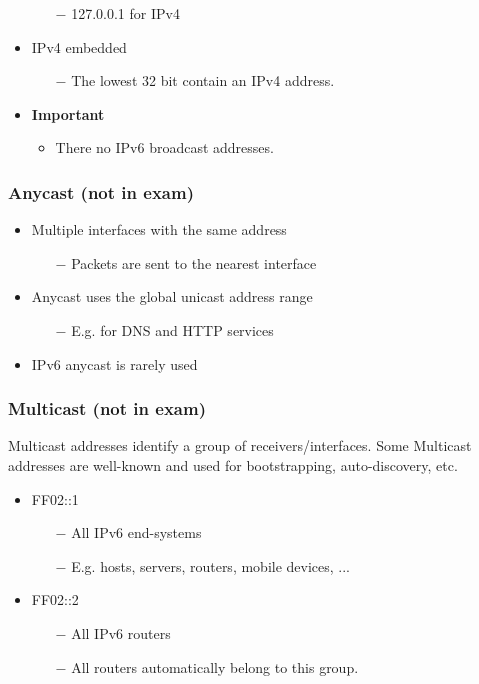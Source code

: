 \documentclass[a4paper, fontsize=8pt, landscape, DIV=1]{scrartcl}
\begin{document}
\begin{multicols*}{4}
\begin{itemize}[noitemsep]
\begin{itemize}
				\item[$-$] 127.0.0.1 for IPv4
			\end{itemize}
			\item IPv4 embedded
			\begin{itemize}
				\item[$-$] The lowest 32 bit contain an IPv4 address. 
			\end{itemize}
			\item \textbf{Important}
			\begin{itemize}
				\item There no IPv6 broadcast addresses. 
			\end{itemize}
		\end{itemize}
		
		\subsubsection{Anycast (not in exam)}
		\begin{itemize}[noitemsep]
			\item Multiple interfaces with the same address
			\begin{itemize}
				\item[$-$] Packets are sent to the nearest interface
			\end{itemize}
			\item Anycast uses the global unicast address range
			\begin{itemize}
				\item[$-$] E.g. for DNS and HTTP services
			\end{itemize}
			\item IPv6 anycast is rarely used
		\end{itemize}
		
		\subsubsection{Multicast (not in exam)}
		Multicast addresses identify a group of receivers/interfaces. Some
		Multicast addresses are well-known and used for bootstrapping, auto-discovery,
		etc. 
		\begin{itemize}[noitemsep]
			\item FF02::1
			\begin{itemize}
				\item[$-$] All IPv6 end-systems
				\item[$-$] E.g. hosts, servers, routers, mobile devices, ... 
			\end{itemize}
			\item FF02::2
			\begin{itemize}
				\item[$-$] All IPv6 routers
				\item[$-$] All routers automatically belong to this group.
			\end{itemize}
		\end{itemize}
		

\end{multicols*}
\end{document}
